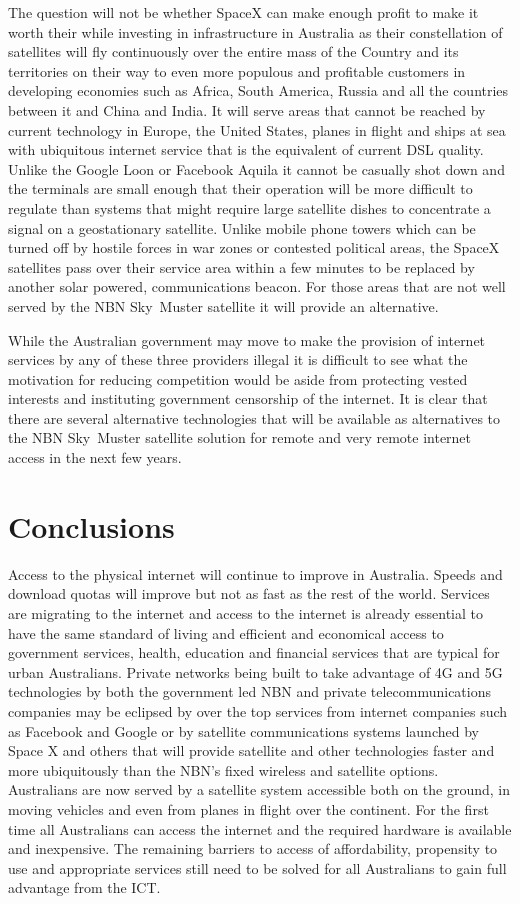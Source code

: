 The question will not be whether SpaceX can make enough profit to make it worth their while investing in infrastructure in Australia as their constellation of satellites will fly continuously over the entire mass of the Country and its territories on their way to even more populous and profitable customers in developing economies such as Africa, South America, Russia and all the countries between it and China and India. It will serve areas that cannot be reached by current technology in Europe, the United States, planes in flight and ships at sea with ubiquitous internet service that is the equivalent of current DSL quality. Unlike the Google Loon or Facebook Aquila it cannot be casually shot down and the terminals are small enough that their operation will be more difficult to regulate than systems that might require large satellite dishes to concentrate a signal on a geostationary satellite. Unlike mobile phone towers which can be turned off by hostile forces in war zones or contested political areas, the SpaceX satellites pass over their service area within a few minutes to be replaced by another solar powered, communications beacon. For those areas that are not well served by the NBN Sky~Muster satellite it will provide an alternative. 

While the Australian government may move to make the provision of internet services by any of these three providers illegal it is difficult to see what the motivation for reducing competition would be aside from protecting vested interests and instituting government censorship of the internet. It is clear that there are several alternative technologies that will be available as alternatives to the NBN Sky~Muster satellite solution for remote and very remote internet access in the next few years.

\section{Conclusions}
Access to the physical internet will continue to improve in Australia. Speeds and download quotas will improve but not as fast as the rest of the world. Services are migrating to the internet and access to the internet is already essential to have the same standard of living and efficient and economical access to government services, health, education and financial services that are typical for urban Australians. Private networks being built to take advantage of 4G and 5G technologies by both the government led NBN and private telecommunications companies may be eclipsed by over the top services from internet companies such as Facebook and Google or by satellite communications systems launched by Space X and others that will provide satellite and other technologies faster and more ubiquitously than the NBN's fixed wireless and satellite options. Australians are now served by a satellite system accessible both on the ground, in moving vehicles and even from planes in flight over the continent. For the first time all Australians can access the internet and the required hardware is available and inexpensive. The remaining barriers to access of affordability, propensity to use and appropriate services still need to be solved for all Australians to gain full advantage from the ICT.
